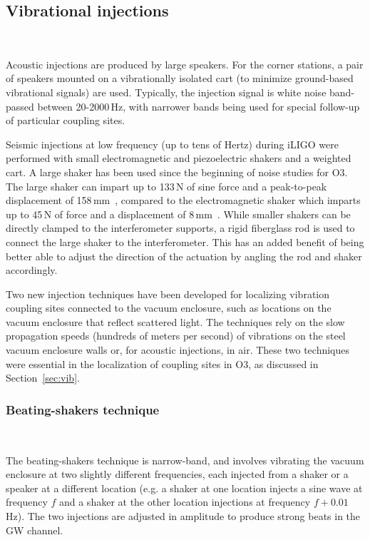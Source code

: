 \subsection{Vibrational injections}~\label{sec:injections-vib}

Acoustic injections are produced by large speakers.
For the corner stations, a pair of speakers mounted on a vibrationally isolated cart (to minimize ground-based vibrational signals) are used.
Typically, the injection signal is white noise band-passed between 20-2000\,Hz, with narrower bands being used for special follow-up of particular coupling sites.

Seismic injections at low frequency (up to tens of Hertz) during \ac{iLIGO} were performed with small electromagnetic and piezoelectric shakers and a weighted cart.
A large shaker has been used since the beginning of noise studies for \ac{O3}.
The large shaker can impart up to 133\,N of sine force and a peak-to-peak displacement of 158\,mm~\citep{big_shaker}, compared to the electromagnetic shaker which imparts up to 45\,N of force and a displacement of 8\,mm~\citep{bk}.
While smaller shakers can be directly clamped to the interferometer supports, a rigid fiberglass rod is used to connect the large shaker to the interferometer.
This has an added benefit of being better able to adjust the direction of the actuation by angling the rod and shaker accordingly.

Two new injection techniques have been developed for localizing vibration coupling sites connected to the vacuum enclosure, such as locations on the vacuum enclosure that reflect scattered light.
The techniques rely on the slow propagation speeds (hundreds of meters per second) of vibrations on the steel vacuum enclosure walls or, for acoustic injections, in air.
These two techniques were essential in the localization of coupling sites in \ac{O3}, as discussed in Section~\ref{sec:vib}.

\subsubsection{Beating-shakers technique}~\label{sec:injections-vib-beats}

The beating-shakers technique is narrow-band, and involves vibrating the vacuum enclosure at two slightly different frequencies, each injected from a shaker or a speaker at a different location (e.g. a shaker at one location injects a sine wave at frequency $f$ and a shaker at the other location injections at frequency $f + 0.01$\,Hz).
The two injections are adjusted in amplitude to produce strong beats in the \ac{GW} channel.

